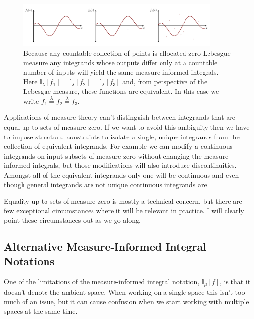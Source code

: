 \documentclass[
  letterpaper,
  DIV=11,
  numbers=noendperiod]{scrartcl}
\begin{document}
\begin{figure}

{\centering \includegraphics[width=0.9\textwidth,height=\textheight]{figures/equivalent_integrands/equivalent_integrands.pdf}

}

\caption{\label{fig-equivalent-integrands}Because any countable
collection of points is allocated zero Lebesgue measure any integrands
whose outputs differ only at a countable number of inputs will yield the
same measure-informed integrals. Here
\(\mathbb{I}_{\lambda}[f_{1}] = \mathbb{I}_{\lambda}[f_{2}] = \mathbb{I}_{\lambda}[f_{3}]\)
and, from perspective of the Lebesgue measure, these functions are
equivalent. In this case we write
\(f_{1} \overset{\lambda}{=} f_{2} \overset{\lambda}{=} f_{3}\).}

\end{figure}

Applications of measure theory can't distinguish between integrands that
are equal up to sets of measure zero. If we want to avoid this ambiguity
then we have to impose structural constraints to isolate a single,
unique integrands from the collection of equivalent integrands. For
example we can modify a continuous integrands on input subsets of
measure zero without changing the measure-informed integrals, but those
modifications will also introduce discontinuities. Amongst all of the
equivalent integrands only one will be continuous and even though
general integrands are not unique continuous integrands are.

Equality up to sets of measure zero is mostly a technical concern, but
there are few exceptional circumstances where it will be relevant in
practice. I will clearly point these circumstances out as we go along.

\hypertarget{sec:alt_notations}{%
\subsection{Alternative Measure-Informed Integral
Notations}\label{sec:alt_notations}}

One of the limitations of the measure-informed integral notation,
\(\mathbb{I}_{\mu}[f]\), is that it doesn't denote the ambient space.
When working on a single space this isn't too much of an issue, but it
can cause confusion when we start working with multiple spaces at the
same time.
\end{document}
